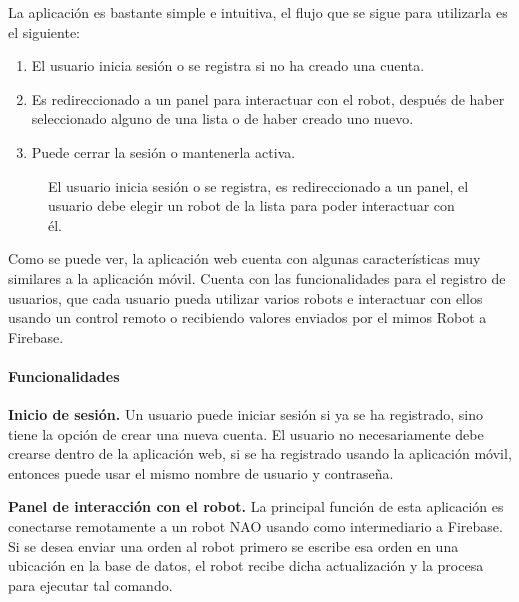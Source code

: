La aplicación es bastante simple e intuitiva, el flujo que se sigue para
utilizarla es el siguiente:
\begin{enumerate}
\item {} 
El usuario inicia sesión o se registra si no ha creado una cuenta.

\item {} 
Es redireccionado a un panel para interactuar con el robot, después de haber seleccionado alguno de una lista o de haber creado uno nuevo.

\item {} 
Puede cerrar la sesión o mantenerla activa.

\end{enumerate}

\begin{figure}[htbp]
\centering
\capstart

\noindent{}
\caption{El usuario inicia sesión o se registra, es redireccionado a un panel, el usuario debe elegir un robot de la lista para poder interactuar con él.}\label{\detokenize{users_docs:webappflow}}\end{figure}

Como se puede ver, la aplicación web cuenta con algunas características
muy similares a la aplicación móvil. Cuenta con las funcionalidades para
el registro de usuarios, que cada usuario pueda utilizar varios robots e
interactuar con ellos usando un control remoto o recibiendo valores enviados
por el mimos Robot a Firebase.


\paragraph{Funcionalidades}

\textbf{Inicio de sesión.}
\label{\detokenize{inicio-de-sesion}}
Un usuario puede iniciar sesión si ya se ha registrado, sino tiene la opción
de crear una nueva cuenta. El usuario no necesariamente debe crearse dentro
de la aplicación web, si se ha registrado usando la aplicación móvil, entonces
puede usar el mismo nombre de usuario y contraseña.


\textbf{Panel de interacción con el robot.}
\label{\detokenize{users_docs:panel-de-inteaccion-con-el-robot}}
La principal función de esta aplicación es conectarse remotamente a un robot
NAO usando como intermediario a Firebase. Si se desea enviar una orden al robot
primero se escribe esa orden en una ubicación en la base de datos, el robot
recibe dicha actualización y la procesa para ejecutar tal comando.

